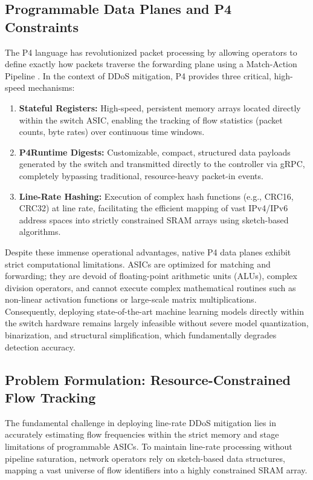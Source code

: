 \documentclass[sigconf, nonacm]{acmart}
\begin{document}
\subsection{Programmable Data Planes and P4 Constraints}
The P4 language has revolutionized packet processing by allowing operators to define exactly how packets traverse the forwarding plane using a Match-Action Pipeline \cite{p4spec}. In the context of DDoS mitigation, P4 provides three critical, high-speed mechanisms:
\begin{enumerate}
    \item \textbf{Stateful Registers:} High-speed, persistent memory arrays located directly within the switch ASIC, enabling the tracking of flow statistics (packet counts, byte rates) over continuous time windows.
    \item \textbf{P4Runtime Digests:} Customizable, compact, structured data payloads generated by the switch and transmitted directly to the controller via gRPC, completely bypassing traditional, resource-heavy packet-in events.
    \item \textbf{Line-Rate Hashing:} Execution of complex hash functions (e.g., CRC16, CRC32) at line rate, facilitating the efficient mapping of vast IPv4/IPv6 address spaces into strictly constrained SRAM arrays using sketch-based algorithms.
\end{enumerate}

Despite these immense operational advantages, native P4 data planes exhibit strict computational limitations. ASICs are optimized for matching and forwarding; they are devoid of floating-point arithmetic units (ALUs), complex division operators, and cannot execute complex mathematical routines such as non-linear activation functions or large-scale matrix multiplications. Consequently, deploying state-of-the-art machine learning models directly within the switch hardware remains largely infeasible without severe model quantization, binarization, and structural simplification, which fundamentally degrades detection accuracy.

\subsection{Problem Formulation: Resource-Constrained Flow Tracking}
The fundamental challenge in deploying line-rate DDoS mitigation lies in accurately estimating flow frequencies within the strict memory and stage limitations of programmable ASICs. To maintain line-rate processing without pipeline saturation, network operators rely on sketch-based data structures, mapping a vast universe of flow identifiers into a highly constrained SRAM array.
\end{document}
